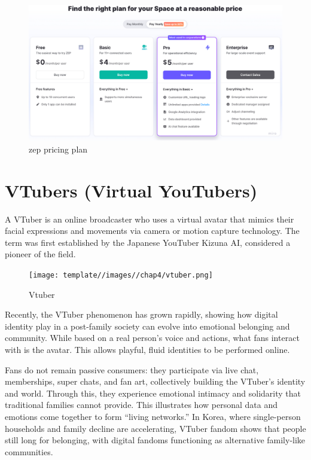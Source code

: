 \begin{figure}
    \centering
    \includegraphics[width=1\linewidth]{template//images//chap4/zep_pricing.png}
    \caption{zep pricing plan}
    \label{fig:placeholder}
\end{figure}

\cleardoublepage

\section{VTubers (Virtual YouTubers)}
A VTuber is an online broadcaster who uses a virtual avatar that mimics their facial expressions and movements via camera or motion capture technology. The term was first established by the Japanese YouTuber Kizuna AI, considered a pioneer of the field.  

\begin{figure}
    \centering
    \texttt{[image: template//images//chap4/vtuber.png]}
    \caption{Vtuber}
    \label{fig:placeholder}
\end{figure}

Recently, the VTuber phenomenon has grown rapidly, showing how digital identity play in a post-family society can evolve into emotional belonging and community. While based on a real person’s voice and actions, what fans interact with is the avatar. This allows playful, fluid identities to be performed online.  

Fans do not remain passive consumers: they participate via live chat, memberships, super chats, and fan art, collectively building the VTuber’s identity and world. Through this, they experience emotional intimacy and solidarity that traditional families cannot provide. This illustrates how personal data and emotions come together to form “living networks.” In Korea, where single-person households and family decline are accelerating, VTuber fandom shows that people still long for belonging, with digital fandoms functioning as alternative family-like communities.  



